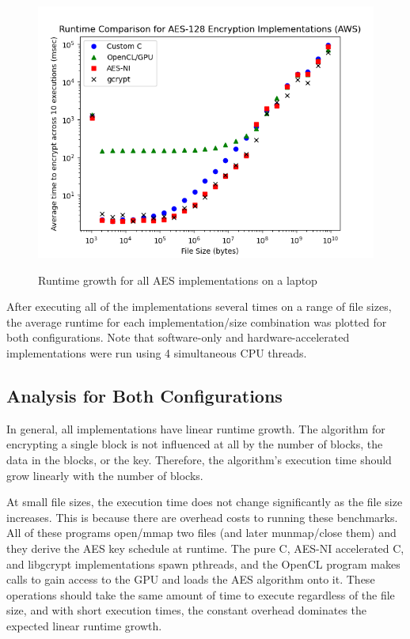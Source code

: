 \documentclass[a4paper,10pt]{article}
\begin{document}
\begin{figure}[H]
 \begin{center}
  \includegraphics[width=\textwidth]{results_aws.png}
  \label{plot_aws}
  \caption{Runtime growth for all AES implementations on a laptop}
 \end{center}
\end{figure}

After executing all of the implementations several times on a range of file sizes, the average runtime for each implementation/size combination was plotted for both configurations.  Note that software-only and hardware-accelerated implementations were run using 4 simultaneous CPU threads.

\subsection{Analysis for Both Configurations}
In general, all implementations have linear runtime growth.  The algorithm for encrypting a single block is not influenced at all by the number of blocks, the data in the blocks, or the key.  Therefore, the algorithm's execution time should grow linearly with the number of blocks.

At small file sizes, the execution time does not change significantly as the file size increases.  This is because there are overhead costs to running these benchmarks.  All of these programs open/mmap two files (and later munmap/close them) and they derive the AES key schedule at runtime.  The pure C, AES-NI accelerated C, and libgcrypt implementations spawn pthreads, and the OpenCL program makes calls to gain access to the GPU and loads the AES algorithm onto it.  These operations should take the same amount of time to execute regardless of the file size, and with short execution times, the constant overhead dominates the expected linear runtime growth.
\end{document}

